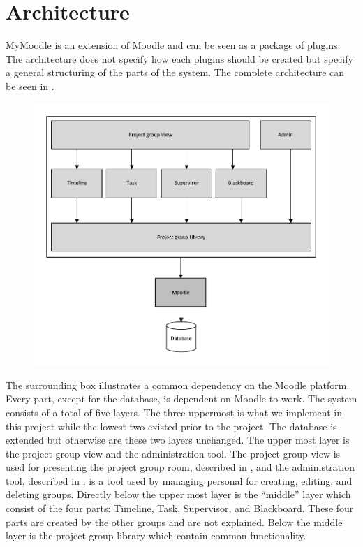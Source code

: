 \section{Architecture}
MyMoodle is an extension of Moodle and can be seen as a package of plugins. 
The architecture does not specify how each plugins should be created but specify a general structuring of the parts of the system. 
The complete architecture can be seen in .
\begin{figure}
	\centering
		\includegraphics{images/architecture.pdf}
	\label{fig:architecture}
\end{figure}
The surrounding box illustrates a common dependency on the Moodle platform. 
Every part, except for the database, is dependent on Moodle to work. 
The system consists of a total of five layers. 
The three uppermost is what we implement in this project while the lowest two existed prior to the project. 
The database is extended but otherwise are these two layers unchanged.
The upper most layer is the project group view and the administration tool.
The project group view is used for presenting the project group room, described in , and the administration tool, described in , is a tool used by managing personal for creating, editing, and deleting groups. 
Directly below the upper most layer is the ``middle'' layer which consist of the four parts: Timeline, Task, Supervisor, and Blackboard. These four parts are created by the other groups and are not explained. 
Below the middle layer is the project group library which contain common functionality.
 

